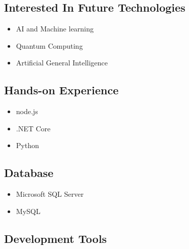 \documentclass[letterpaper]{deedy-resume} %
\begin{document}
\begin{minipage}[t]{0.33\textwidth}
\vspace{-\topsep}


\subsection{Interested In Future Technologies}

\begin{itemize}
\setlength\itemsep{-0.5em} %
\item AI and Machine learning
\item Quantum Computing
\item Artificial General Intelligence
\end{itemize}




\vspace{-\topsep}

\subsection{Hands-on Experience}

\begin{itemize}
\setlength\itemsep{-0.5em} %
\item node.js
\item .NET Core
\item Python
\end{itemize}



\vspace{-\topsep}


\subsection{Database}

\begin{itemize}
\setlength\itemsep{-0.5em} %
\item Microsoft SQL Server
\item MySQL
\end{itemize}



\vspace{-\topsep}


\subsection{Development Tools}


\end{minipage}
\end{document}
